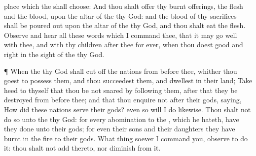 {place which the
{} shall
choose:
And thou shalt
offer thy burnt
offerings, the
flesh and the
blood, upon the
altar of the
{} thy
God: and the
blood of thy
sacrifices shall be poured
out upon the
altar of the
{} thy
God, and thou shalt
eat the
flesh.
Observe and
hear all these
words which I
command thee, that it may go
well with thee, and with thy
children
after thee
for
ever, when thou
doest
{}
good and
right in the
sight of the
{} thy
God.
\par }{\PP {}¶ When the
{} thy
God shall cut
off the
nations from
before thee, whither thou
goest to
possess them, and thou
succeedest them, and
dwellest in their
land;
Take
heed to thyself that thou be not
snared by
following them,
after that they be
destroyed from
before thee; and that thou
enquire not after their
gods,
saying, How did these
nations
serve their
gods? even so will I
do
likewise.
Thou shalt not
do so unto the
{} thy
God: for every
abomination to the
{}, which he
hateth, have they
done unto their
gods; for even their
sons and their
daughters they have
burnt in the
fire to their
gods.
What
thing soever I
command you,
observe to
do it: thou shalt not
add thereto, nor
diminish from it.

}
